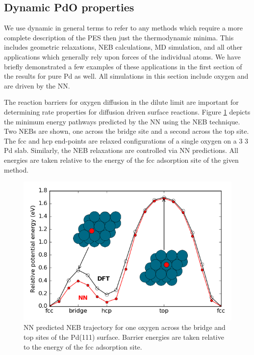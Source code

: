 \documentclass[12pt]{cmuthesis}
\begin{document}
\subsection{Dynamic PdO properties}
\label{sec:org1e7bd3f}
We use dynamic in general terms to refer to any methods which require a more complete description of the PES then just the thermodynamic minima. This includes geometric relaxations, NEB calculations, MD simulation, and all other applications which generally rely upon forces of the individual atoms. We have briefly demonstrated a few examples of these applications in the first section of the results for pure Pd as well. All simulations in this section include oxygen and are driven by the NN.

The reaction barriers for oxygen diffusion in the dilute limit are important for determining rate properties for diffusion driven surface reactions. Figure \ref{fig-PdO1-NEB} depicts the minimum energy pathways predicted by the NN using the NEB technique. Two NEBs are shown, one across the bridge site and a second across the top site. The fcc and hcp end-points are relaxed configurations of a single oxygen on a 3 \texttimes{} 3 Pd slab. Similarly, the NEB relaxations are controlled via NN predictions. All energies are taken relative to the energy of the fcc adsorption site of the given method.

\begin{figure}[htbp]
\centering
\includegraphics[width=5in]{./images/PdO1-NEB.png}
\caption{\label{fig-PdO1-NEB}
NN predicted NEB trajectory for one oxygen across the bridge and top sites of the Pd(111) surface. Barrier energies are taken relative to the energy of the fcc adsorption site.}
\end{figure}
\end{document}
